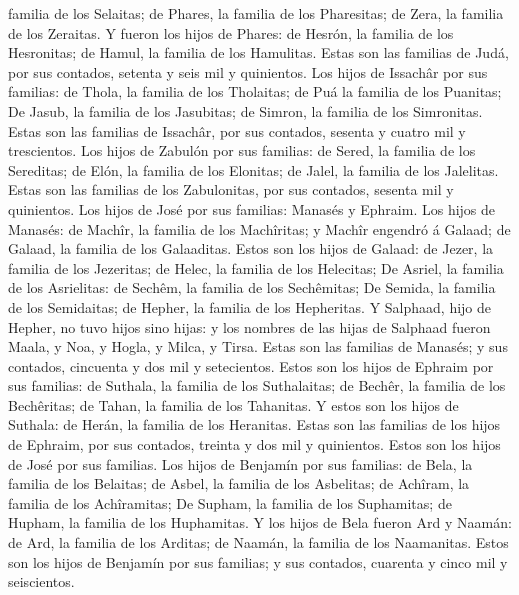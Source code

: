 familia de los Selaitas; de Phares, la familia de los Pharesitas; de
Zera, la familia de los Zeraitas.  Y fueron los hijos de
Phares: de Hesrón, la familia de los Hesronitas; de Hamul, la familia de
los Hamulitas.  Estas son las familias de Judá, por sus
contados, setenta y seis mil y quinientos.  Los hijos de
Issachâr por sus familias: de Thola, la familia de los Tholaitas; de Puá
la familia de los Puanitas;  De Jasub, la familia de los
Jasubitas; de Simron, la familia de los Simronitas.  Estas
son las familias de Issachâr, por sus contados, sesenta y cuatro mil y
trescientos.  Los hijos de Zabulón por sus familias: de
Sered, la familia de los Sereditas; de Elón, la familia de los Elonitas;
de Jalel, la familia de los Jalelitas.  Estas son las
familias de los Zabulonitas, por sus contados, sesenta mil y quinientos.
 Los hijos de José por sus familias: Manasés y Ephraim.
 Los hijos de Manasés: de Machîr, la familia de los
Machîritas; y Machîr engendró á Galaad; de Galaad, la familia de los
Galaaditas.  Estos son los hijos de Galaad: de Jezer, la
familia de los Jezeritas; de Helec, la familia de los Helecitas;
 De Asriel, la familia de los Asrielitas: de Sechêm, la
familia de los Sechêmitas;  De Semida, la familia de los
Semidaitas; de Hepher, la familia de los Hepheritas.  Y
Salphaad, hijo de Hepher, no tuvo hijos sino hijas: y los nombres de las
hijas de Salphaad fueron Maala, y Noa, y Hogla, y Milca, y Tirsa.
 Estas son las familias de Manasés; y sus contados,
cincuenta y dos mil y setecientos.  Estos son los hijos de
Ephraim por sus familias: de Suthala, la familia de los Suthalaitas; de
Bechêr, la familia de los Bechêritas; de Tahan, la familia de los
Tahanitas.  Y estos son los hijos de Suthala: de Herán, la
familia de los Heranitas.  Estas son las familias de los
hijos de Ephraim, por sus contados, treinta y dos mil y quinientos.
Estos son los hijos de José por sus familias.  Los hijos de
Benjamín por sus familias: de Bela, la familia de los Belaitas; de
Asbel, la familia de los Asbelitas; de Achîram, la familia de los
Achîramitas;  De Supham, la familia de los Suphamitas; de
Hupham, la familia de los Huphamitas.  Y los hijos de Bela
fueron Ard y Naamán: de Ard, la familia de los Arditas; de Naamán, la
familia de los Naamanitas.  Estos son los hijos de Benjamín
por sus familias; y sus contados, cuarenta y cinco mil y seiscientos.
